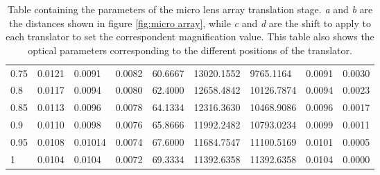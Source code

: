 \begin{sidewaystable}[]
{\begin{tabular}{lllllllll}
		0.75          & 0.0121 & 0.0091  & 0.0082 & 60.6667 & 13020.1552            & 9765.1164             & 0.0091  & 0.0030 \\
		0.8           & 0.0117      & 0.0094 & 0.0080 & 62.4000        & 12658.4842           & 10126.7874           & 0.0094 & 0.0023     \\
		0.85          & 0.0113 & 0.0096 & 0.0078 & 64.1334 & 12316.3630           & 10468.9086           & 0.0096 & 0.0017 \\
		0.9           & 0.0110 & 0.0098 & 0.0076 & 65.8666 & 11992.2482           & 10793.0234           & 0.0099 & 0.0011 \\
		0.95          & 0.0108 & 0.01014 & 0.0074  & 67.6000        & 11684.7547           & 11100.5169           & 0.0101 & 0.0005 \\
		1             & 0.0104      & 0.0104  & 0.0072 & 69.3334 & 11392.6358            & 11392.6358            & 0.0104  & 0.0000          
	\end{tabular}
}
	\caption{Table containing the parameters of the micro lens array translation stage. \textit{a} and \textit{b} are the distances shown in figure \ref{fig:micro array}, while \textit{c} and \textit{d} are the shift to apply to each translator to set the correspondent magnification value. This table also shows the optical parameters corresponding to the different positions of the translator.  }
\end{sidewaystable}
